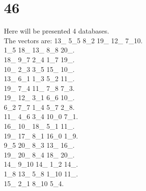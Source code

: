 \chapter{46}
\indent Here will be presented 4 databases.\\
The vectors are:
13\_ 5\_5 8\_2 19\_ 12\_ 7\_10.\\1\_5 18\_ 13\_ 8\_8 20\_.\\18\_ 9\_7 2\_4 1\_7 19\_.\\10\_ 2\_3 3\_5 15\_ 10\_.\\13\_ 6\_1 1\_3 5\_2 11\_.\\19\_ 7\_4 11\_ 7\_8 7\_3.\\19\_ 12\_ 3\_1 6\_6 10\_.\\6\_2 7\_7 1\_4 5\_7 2\_8.\\11\_ 4\_6 3\_4 10\_0 7\_1.\\16\_ 10\_ 18\_ 5\_1 11\_.\\19\_ 17\_ 8\_1 16\_0 1\_9.\\9\_5 20\_ 8\_3 13\_ 16\_.\\19\_ 20\_ 8\_4 18\_ 20\_.\\14\_ 9\_10 14\_ 1\_2 14\_.\\1\_8 13\_ 5\_8 1\_10 11\_.\\15\_ 2\_1 8\_10 5\_4.\\